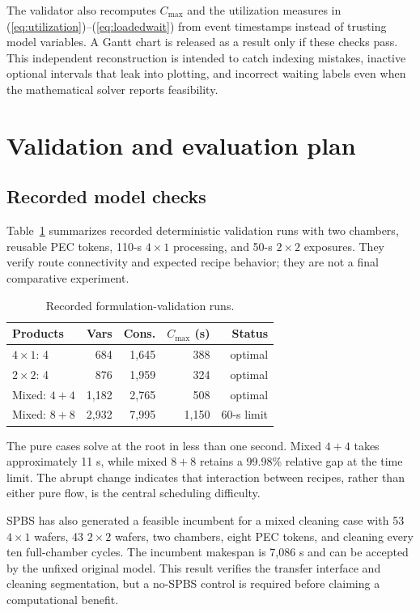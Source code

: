 \documentclass[5p,times,procedia]{elsarticle}
\begin{document}
The validator also recomputes $C_{\max}$ and the utilization measures in (\ref{eq:utilization})--(\ref{eq:loadedwait}) from event timestamps instead of trusting model variables. A Gantt chart is released as a result only if these checks pass. This independent reconstruction is intended to catch indexing mistakes, inactive optional intervals that leak into plotting, and incorrect waiting labels even when the mathematical solver reports feasibility.

\section{Validation and evaluation plan}

\subsection{Recorded model checks}

Table~\ref{tab:validation} summarizes recorded deterministic validation runs with two chambers, reusable PEC tokens, 110-s $4\times1$ processing, and 50-s $2\times2$ exposures. They verify route connectivity and expected recipe behavior; they are not a final comparative experiment.

\begin{table}[t]
\caption{Recorded formulation-validation runs.}
\label{tab:validation}
\centering
\begin{tabular}{lrrrr}
\toprule
Products & Vars & Cons. & $C_{\max}$ (s) & Status\\
\midrule
$4\times1$: 4 & 684 & 1,645 & 388 & optimal\\
$2\times2$: 4 & 876 & 1,959 & 324 & optimal\\
Mixed: $4+4$ & 1,182 & 2,765 & 508 & optimal\\
Mixed: $8+8$ & 2,932 & 7,995 & 1,150 & 60-s limit\\
\bottomrule
\end{tabular}
\end{table}

The pure cases solve at the root in less than one second. Mixed $4+4$ takes approximately 11 s, while mixed $8+8$ retains a 99.98\% relative gap at the time limit. The abrupt change indicates that interaction between recipes, rather than either pure flow, is the central scheduling difficulty.

SPBS has also generated a feasible incumbent for a mixed cleaning case with 53 $4\times1$ wafers, 43 $2\times2$ wafers, two chambers, eight PEC tokens, and cleaning every ten full-chamber cycles. The incumbent makespan is 7,086 s and can be accepted by the unfixed original model. This result verifies the transfer interface and cleaning segmentation, but a no-SPBS control is required before claiming a computational benefit.
\end{document}
